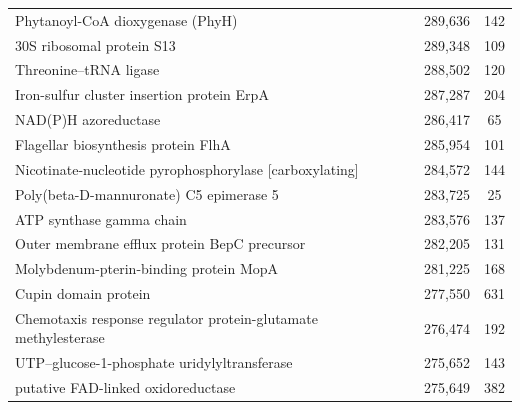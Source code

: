 \begin{singlespace}
\begin{longtable}{p{} cc}
                                                          Phytanoyl-CoA dioxygenase (PhyH) &                     289,636 &           142 \\
                                                                 30S ribosomal protein S13 &                     289,348 &           109 \\
                                                                    Threonine--tRNA ligase &                     288,502 &           120 \\
                                                Iron-sulfur cluster insertion protein ErpA &                     287,287 &           204 \\
                                                                      NAD(P)H azoreductase &                     286,417 &            65 \\
                                                       Flagellar biosynthesis protein FlhA &                     285,954 &           101 \\
                                   Nicotinate-nucleotide pyrophosphorylase [carboxylating] &                     284,572 &           144 \\
                                                   Poly(beta-D-mannuronate) C5 epimerase 5 &                     283,725 &            25 \\
                                                                  ATP synthase gamma chain &                     283,576 &           137 \\
                                              Outer membrane efflux protein BepC precursor &                     282,205 &           131 \\
                                                    Molybdenum-pterin-binding protein MopA &                     281,225 &           168 \\
                                                                      Cupin domain protein &                     277,550 &           631 \\
                            Chemotaxis response regulator protein-glutamate methylesterase &                     276,474 &           192 \\
                                              UTP--glucose-1-phosphate uridylyltransferase &                     275,652 &           143 \\
                                                        putative FAD-linked oxidoreductase &                     275,649 &           382 \\
\end{longtable}
\end{singlespace}



